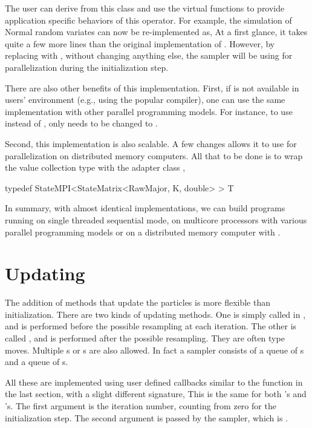 The user can derive from this class and use the virtual functions to provide application specific behaviors of this operator. For example, the simulation of Normal random variates can now be re-implemented as,
At a first glance, it takes quite a few more lines than the original implementation of . However, by replacing  with , without changing anything else, the sampler will be using \openmp for parallelization during the initialization step.

There are also other benefits of this implementation. First, if \openmp is not available in users' \cpp environment (e.g., using the popular \clang \cite{clang} compiler), one can use the same implementation with other parallel programming models. For instance, to use \tbb instead of \openmp, only  needs to be changed to .

Second, this implementation is also scalable. A few changes allows it to use \mpi for parallelization on distributed memory computers. All that  to be done is to wrap the value collection type with the adapter class
,
\begin{cppcode}
typedef StateMPI<StateMatrix<RawMajor, K, double> > T
\end{cppcode}

In summary, with almost identical implementations, we can build programs running on single threaded sequential mode, on multicore processors with various parallel programming models or on a distributed memory computer with \mpi.

\section{Updating}
\label{sec:Updating}

The addition of methods that update the particles is more flexible than initialization. There are two kinds of updating methods. One is simply called  in \vsmc, and is performed before the possible resampling at each iteration. The other is called , and is performed after the possible resampling. They are often \mcmc type moves. Multiple s or s are also allowed. In fact a \vsmc sampler consists of a queue of s and a queue of s.

All these are implemented using user defined callbacks similar to the  function in the last section, with a slight different signature,
This is the same for both 's and 's. The first argument is the iteration number, counting from zero for the initialization step. The second argument is passed by the sampler, which is .

